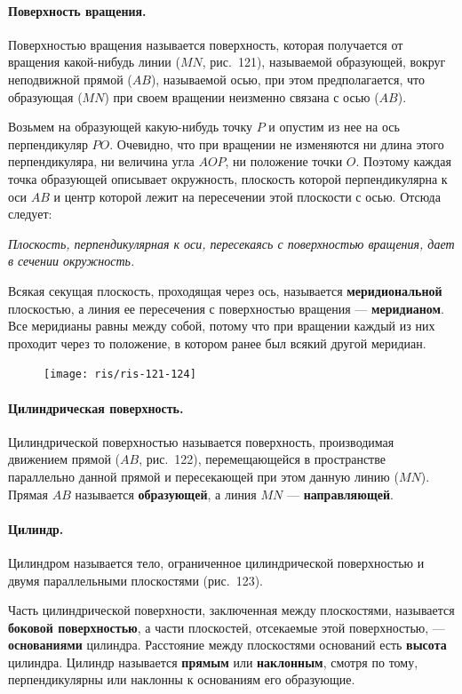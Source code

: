 \documentclass[twoside]{book}
\begin{document}
\paragraph{Поверхность вращения.}\label{1938/s105}
Поверхностью вращения называется поверхность, которая получается от вращения какой-нибудь линии ($MN$, рис.~121), называемой образующей, вокруг неподвижной прямой ($AB$), называемой осью, при этом предполагается, что образующая ($MN$) при своем вращении неизменно связана с осью ($AB$).

Возьмем на образующей какую-нибудь точку $P$ и опустим из нее на ось перпендикуляр $PO$.
Очевидно, что при вращении не изменяются ни длина этого перпендикуляра, ни величина угла $AOP$, ни положение точки $O$.
Поэтому каждая точка образующей описывает окружность, плоскость которой перпендикулярна к оси $AB$ и центр которой лежит на пересечении этой плоскости с осью.
Отсюда следует:

\emph{Плоскость, перпендикулярная к оси, пересекаясь с поверхностью вращения, дает в сечении окружность.}

Всякая секущая плоскость, проходящая через ось, называется \textbf{меридиональной} плоскостью, а линия ее пересечения с поверхностью вращения --- \textbf{меридианом}.
Все меридианы равны между собой, потому что при вращении каждый из них проходит через то положение, в котором ранее был всякий другой меридиан.
\begin{figure}[h!]
\centering
\texttt{[image: ris/ris-121-124]}
\caption{}
\end{figure}

\paragraph{Цилиндрическая поверхность.}\label{1938/s106}
Цилиндрической поверхностью называется поверхность, производимая движением прямой ($AB$, рис.~122), перемещающейся в пространстве параллельно данной прямой и пересекающей при этом данную линию ($MN$).
Прямая $AB$ называется \textbf{образующей}, а линия $MN$ --- \textbf{направляющей}.

\paragraph{Цилиндр.}\label{1938/s107}
Цилиндром называется тело, ограниченное цилиндрической поверхностью и двумя параллельными плоскостями (рис.~123).

Часть цилиндрической поверхности, заключенная между плоскостями, называется \textbf{боковой поверхностью}, а части плоскостей, отсекаемые этой поверхностью, --- \textbf{основаниями} цилиндра.
Расстояние между плоскостями оснований есть \textbf{высота} цилиндра.
Цилиндр называется \textbf{прямым} или \textbf{наклонным}, смотря по тому, перпендикулярны или наклонны к основаниям его образующие.
\end{document}
